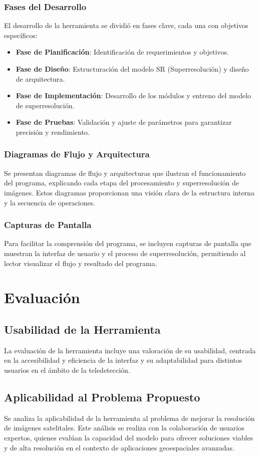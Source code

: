 \subsection{Fases del Desarrollo}
El desarrollo de la herramienta se dividió en fases clave, cada una con objetivos específicos:
\begin{itemize}
    \item \textbf{Fase de Planificación}: Identificación de requerimientos y objetivos.
    \item \textbf{Fase de Diseño}: Estructuración del modelo SR (Superresolución) y diseño de arquitectura.
    \item \textbf{Fase de Implementación}: Desarrollo de los módulos y entreno del modelo de superresolución.
    \item \textbf{Fase de Pruebas}: Validación y ajuste de parámetros para garantizar precisión y rendimiento.
\end{itemize}

\subsection{Diagramas de Flujo y Arquitectura}
Se presentan diagramas de flujo y arquitecturas que ilustran el funcionamiento del programa, explicando cada etapa del procesamiento y superresolución de imágenes. Estos diagramas proporcionan una visión clara de la estructura interna y la secuencia de operaciones.

\subsection{Capturas de Pantalla}
Para facilitar la comprensión del programa, se incluyen capturas de pantalla que muestran la interfaz de usuario y el proceso de superresolución, permitiendo al lector visualizar el flujo y resultado del programa.

\chapter{Evaluación}

\section{Usabilidad de la Herramienta}
La evaluación de la herramienta incluye una valoración de su usabilidad, centrada en la accesibilidad y eficiencia de la interfaz y su adaptabilidad para distintos usuarios en el ámbito de la teledetección.

\section{Aplicabilidad al Problema Propuesto}
Se analiza la aplicabilidad de la herramienta al problema de mejorar la resolución de imágenes satelitales. Este análisis se realiza con la colaboración de usuarios expertos, quienes evalúan la capacidad del modelo para ofrecer soluciones viables y de alta resolución en el contexto de aplicaciones geoespaciales avanzadas.

